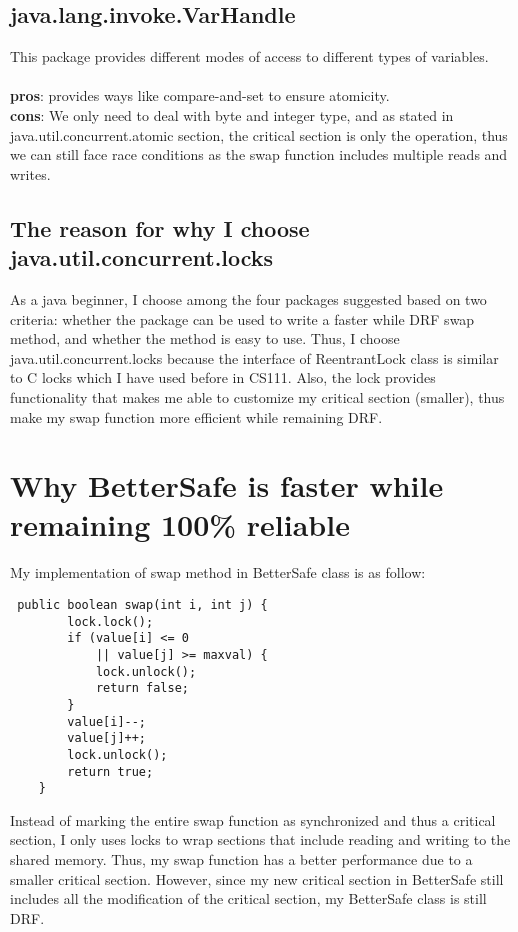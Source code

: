 \documentclass[letterpaper,twocolumn,10pt]{article}
\begin{document}
\subsection{java.lang.invoke.VarHandle}
This package provides different modes of access to different types of variables. \\~\\
\textbf{pros}: provides ways like compare-and-set to ensure atomicity. \\
\textbf{cons}: We only need to deal with byte and integer type, and as stated in java.util.concurrent.atomic section, the critical section is only the operation, thus we can still face race conditions as the swap function includes multiple reads and writes.
\subsection{The reason for why I choose java.util.concurrent.locks}
As a java beginner, I choose among the four packages suggested based on two criteria: whether the package can be used to write a faster while DRF swap method, and whether the method is easy to use. Thus, I choose java.util.concurrent.locks because the interface of ReentrantLock class is similar to C locks which I have used before in CS111. Also, the lock provides functionality that makes me able to customize my critical section (smaller), thus make my swap function more efficient while remaining DRF.



\section{Why BetterSafe is faster while remaining 100\% reliable}
My implementation of swap method in BetterSafe class is as follow:

\begin{verbatim}
 public boolean swap(int i, int j) {
        lock.lock();
        if (value[i] <= 0 
            || value[j] >= maxval) {
            lock.unlock();
            return false;
        }
        value[i]--;
        value[j]++;
        lock.unlock();
        return true;
    }
\end{verbatim}

Instead of marking the entire swap function as synchronized and thus a critical section, I only uses locks to wrap sections that include reading and writing to the shared memory. Thus, my swap function has a better performance due to a smaller critical section. However, since my new critical section in BetterSafe still includes all the modification of the critical section, my BetterSafe class is still DRF.
\end{document}
